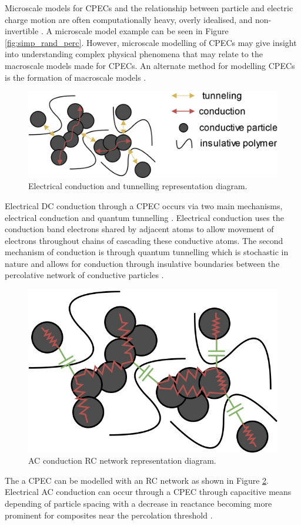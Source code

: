 Microscale models for CPECs and the relationship between particle and electric charge motion are often computationally heavy, overly idealised, and non-invertible \cite{Wang2022}. A microscale model example can be seen in Figure \ref{fig:simp_rand_perc}. However, microscale modelling of CPECs may give insight into understanding complex physical phenomena that may relate to the macroscale models made for CPECs. An alternate method for modelling CPECs is the formation of macroscale models \cite{Neffati2019}.
\begin{figure}[H]
	\centering
	\includegraphics[width=0.7\linewidth]{Figures/conduction-tunneling-mechanisms.jpg}
	\caption{Electrical conduction and tunnelling representation diagram.}
	\label{fig:tunneling-model-rep}
\end{figure}
Electrical DC conduction through a CPEC occurs via two main mechanisms, electrical conduction and quantum tunnelling \cite{Bloor2006,Duan2014,Zhang2007,Madrid2017}. Electrical conduction uses the conduction band electrons shared by adjacent atoms to allow movement of electrons throughout chains of cascading these conductive atoms. The second mechanism of conduction is through quantum tunnelling which is stochastic in nature and allows for conduction through insulative boundaries between the percolative network of conductive particles \cite{Hu2008,Grimaldi2006}. 
\begin{figure}[H]
	\centering
	\includegraphics[width=0.4\linewidth]{Figures/conduction-AC-mechanisms.jpg}
	\caption{AC conduction RC network representation diagram.}
	\label{fig:AC-model-rep}
\end{figure}
The a CPEC can be modelled with an RC network as shown in Figure \ref{fig:AC-model-rep}. Electrical AC conduction can occur through a CPEC through capacitive means depending of particle spacing with a decrease in reactance becoming more prominent for composites near the percolation threshold \cite{HindermannBischoff2001,Ilgaz2021,Buketov2020}.


